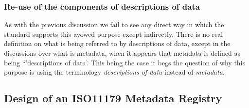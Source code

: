 \documentclass{llncs}
\begin{document}
\subsubsection{Re-use of the components of descriptions of data}

As with the previous discussion we fail to see any direct way in which the standard supports this avowed purpose except indirectly. There is no real definition on what is being referred to by descriptions of data, except in the discussions over what is metadata, when it appears that metadata is defined as being ``'descriptions of data'. This being the case it begs the question of why this purpose is using the terminology \emph{descriptions of data} instead of \emph{metadata}. 

\subsection{Design of an ISO11179 Metadata Registry}
\end{document}
